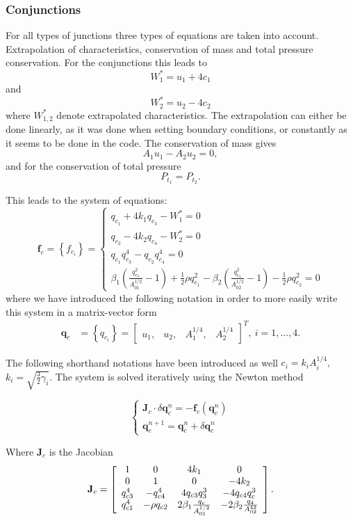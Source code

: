 \documentclass[a4paper, oneside]{discothesis}
\begin{document}
\subsubsection{Conjunctions}
For all types of junctions three types of equations are taken into account. 
Extrapolation of characteristics, conservation of mass and total pressure conservation.
For the conjunctions this leads to
$$
W_1^*=u_1+4 c_1
$$
and 
$$
W_2^*=u_2-4 c_2
$$
where $W_{1,2}^*$ denote extrapolated characteristics. 
The extrapolation can either be done linearly, as it was done when setting boundary conditions, or constantly as it seems to be done in the code. 
The conservation of mass gives
$$A_1 u_1-A_2 u_2=0,$$
and for the conservation of total pressure
$$P_{t_1}=P_{t_2}.$$

This leads to the system of equations:
$$
\mathbf{f}_c=\left\{f_{c_i}\right\}=\left\{\begin{array}{l}
		q_{c_1}+4 k_1 q_{c_3}-W_1^*=0 \\
		q_{c_2}-4 k_2 q_{c_4}-W_2^*=0 \\
		q_{c_1} q_{c_3}^4-q_{c_2} q_{c_4}^4=0 \\
		\beta_1\left(\frac{q_{c_3}^2}{A_{01}^{1 / 2}}-1\right)+\frac{1}{2} \rho q_{c_1}^2-\beta_2\left(\frac{q_{c_4}^2}{A_{02}^{1 / 2}}-1\right)-\frac{1}{2} \rho q_{c_2}^2=0
\end{array}\right.
$$
where we have introduced the following notation in order to more easily write this system in a matrix-vector form
$$
\begin{aligned}
	\mathbf{q}_c&=\left\{q_{c_i}\right\}=\left[\begin{array}{llll}
		u_1, & u_2, & A_1^{1 / 4}, & A_2^{1 / 4}
\end{array}\right]^T,\  i=1, \ldots, 4. 
\end{aligned}
$$

The following shorthand notations have been introduced as well $c_i=k_i A_i^{1 / 4},$  $k_i=\sqrt{\frac{3}{2} \gamma_i}$.
The system is solved iteratively using the Newton method

$$
\left\{\begin{array}{l}
		\mathbf{J}_c \cdot \delta \mathbf{q}_c^n=-\mathbf{f}_c\left(\mathbf{q}_c^n\right) \\
		\mathbf{q}_c^{n+1}=\mathbf{q}_c^n+\delta \mathbf{q}_c^n
\end{array}\right.
$$

Where $\mathbf{J}_c$ is the Jacobian
$$\mathbf{J}_{c}=\left[\begin{array}{c c c c}{{{1}}}&{{0}}&{{{4}k_{1}}}&{{0}}\\ {{0}}&{{{1}}}&{{0}}&{{-4k_{2}}}\\ {{q_{c3}^{4}}}&{{-q_{c4}^{4}}}&{{4q_{c3}q_{3}^{3}}}&{{-4q_{c4}q_{c}^{3}}}\\ {{q_{c1}^{4}}}&{{-\rho q_{c2}}}&{{2\beta_{1}\frac{q_{c}}{A_{01}^{1/2}}}}&{{-2\beta_{2}\frac{q_{4}}{A_{02}^{42}}}}\end{array}\right].$$
\end{document}
